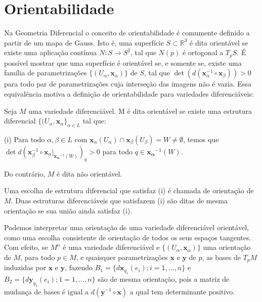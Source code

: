 \section{Orientabilidade}
\label{loc:orientabilidade}
Na Geometria Diferencial o conceito de orientabilidade é comumente definido a partir de um mapa de Gauss. Isto é, uma superfície $S \subset \mathbb{R}^{3}$ é dita orientável se existe uma aplicação contínua $N:S\to S^{2}$, tal que $N(p)$ é ortogonal a $T_{p}S$.
É possível mostrar que uma superfície é orientável se, e somente se, existe uma família de parametrizações $\{ (U_{\alpha}, \mathbf{x}_{\alpha}) \}$ de $S$, tal que $\det(d(\mathbf{x}_{\alpha}^{-1} \circ \mathbf{x}_{\beta}))>0$ para todo par de parametrizações cuja interseção das imagens não é vazia.
Essa equivalência motiva a definição de orientabilidade para variedades diferenciáveis:
\begin{definition}
    \label{loc:4.4_:_def_6_:_orientabilidade}
    Seja $M$ uma variedade diferenciável. M é dita orientável se existe uma estrutura diferencial $\{ (U_{\alpha}, \mathbf{x}_{\alpha} \}_{\alpha \in L}$ tal que:

    (i) Para todo $\alpha, \beta \in L$ com $\mathbf{x}_{\alpha}(U_{\alpha})\cap \mathbf{x}_{\beta}(U_{\beta}) = W \neq \emptyset$, temos que $\det d(\mathbf{x}_{\beta}^{-1}\circ \mathbf{x}_{\alpha}|_{\mathbf{x_{\alpha}}^{-1}(W)})_{q} >0$ para todo $q\in \mathbf{x_{\alpha}}^{-1}(W)$.

    Do contrário, $M$ é dita não orientável.

    Uma escolha de estrutura diferencial que satisfaz (i) é chamada de orientação de $M$.
    Duas estruturas diferenciáveis que satisfazem (i) são ditas de mesma orientação se sua união ainda satisfaz (i).
\end{definition}
Podemos interpretar uma orientação de uma variedade diferenciável orientável, como uma escolha consistente de orientação de todos os seus espaços tangentes. Com efeito, se $M^{n}$ é uma variedade diferenciável e $\{ (U_{\alpha}, \mathbf{x}_{\alpha}) \}$ uma orientação de $M$, para todo $p \in M$, e quaisquer parametrizações $\mathbf{x}$ e $\mathbf{y}$ de $p$, as bases de $T_{p}M$ induzidas por $\mathbf{x}$ e $\mathbf{y}$, fazendo $B_{1}=\{ d\mathbf{x}_{q_{1}}(e_{i});i =1, \dots, n \}$ e $B_{2}=\{ d\mathbf{y}_{q_{2}}(e_{i});1=1, \dots, n \}$ são de mesma orientação, pois a matriz de mudança de bases é igual a $d(\mathbf{y}^{-1} \circ \mathbf{x})$ a qual tem determinante positivo.

